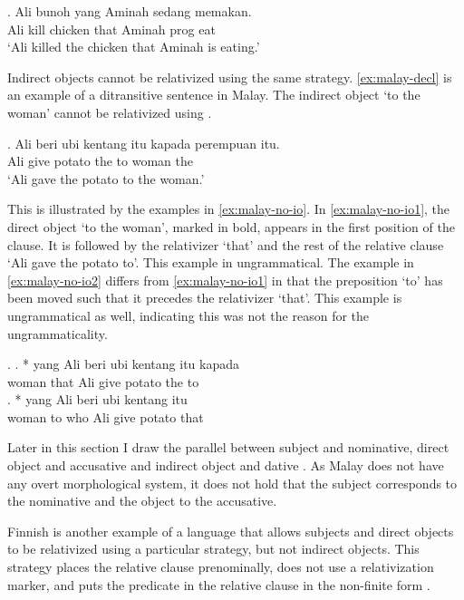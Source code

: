 \exg. Ali bunoh  yang Aminah sedang memakan.\\
 Ali kill chicken that Aminah \ac{prog} eat\\
 `Ali killed the chicken that Aminah is eating.' \label{ex:malay-do}

Indirect objects cannot be relativized using the same strategy. \ref{ex:malay-decl} is an example of a ditransitive sentence in Malay. The indirect object  `to the woman' cannot be relativized using .

\exg. Ali beri {ubi kentang} itu kapada perempuan itu.\\
 Ali give potato the to woman the\\
 `Ali gave the potato to the woman.'\label{ex:malay-decl} 

This is illustrated by the examples in \ref{ex:malay-no-io}. In \ref{ex:malay-no-io1}, the direct object  `to the woman', marked in bold, appears in the first position of the clause. It is followed by the relativizer  `that' and the rest of the relative clause  `Ali gave the potato to'. This example in ungrammatical.
The example in \ref{ex:malay-no-io2} differs from \ref{ex:malay-no-io1} in that the preposition  `to' has been moved such that it precedes the relativizer  `that'. This example is ungrammatical as well, indicating this was not the reason for the ungrammaticality.

\ex.\label{ex:malay-no-io}
\ag. * yang Ali beri {ubi kentang} itu kapada\\
 woman that Ali give potato the to\\\label{ex:malay-no-io1}
\bg. *  yang Ali beri {ubi kentang} itu\\
 woman to who Ali give potato that\\\label{ex:malay-no-io2}

Later in this section I draw the parallel between subject and nominative, direct object and accusative and indirect object and dative \citep[after][]{caha2009}. As Malay does not have any overt morphological system, it does not hold that the subject corresponds to the nominative and the object to the accusative.

Finnish is another example of a language that allows subjects and direct objects to be relativized using a particular strategy, but not indirect objects. This strategy places the relative clause prenominally, does not use a relativization marker, and puts the predicate in the relative clause in the non-finite form \citep{keenan1977}.

